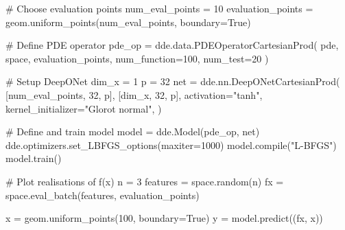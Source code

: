\documentclass[
  spanish,
  us-letterpaper,
]{scrreprt}
\newenvironment{Shaded}{\begin{snugshade}}{\end{snugshade}}
\newcommand{\BuiltInTok}[1]{\textcolor[rgb]{0.00,0.23,0.31}{#1}}
\newcommand{\CommentTok}[1]{\textcolor[rgb]{0.37,0.37,0.37}{#1}}
\newcommand{\DecValTok}[1]{\textcolor[rgb]{0.68,0.00,0.00}{#1}}
\newcommand{\NormalTok}[1]{\textcolor[rgb]{0.00,0.23,0.31}{#1}}
\newcommand{\OperatorTok}[1]{\textcolor[rgb]{0.37,0.37,0.37}{#1}}
\newcommand{\StringTok}[1]{\textcolor[rgb]{0.13,0.47,0.30}{#1}}
\newcommand{\VariableTok}[1]{\textcolor[rgb]{0.07,0.07,0.07}{#1}}
\theoremstyle{plain}
\theoremstyle{definition}
\theoremstyle{remark}
\begin{document}
\begin{Shaded}
\begin{Highlighting}[]
\CommentTok{\# Choose evaluation points}
\NormalTok{num\_eval\_points }\OperatorTok{=} \DecValTok{10}
\NormalTok{evaluation\_points }\OperatorTok{=}\NormalTok{ geom.uniform\_points(num\_eval\_points, boundary}\OperatorTok{=}\VariableTok{True}\NormalTok{)}

\CommentTok{\# Define PDE operator}
\NormalTok{pde\_op }\OperatorTok{=}\NormalTok{ dde.data.PDEOperatorCartesianProd(}
\NormalTok{    pde,}
\NormalTok{    space,}
\NormalTok{    evaluation\_points,}
\NormalTok{    num\_function}\OperatorTok{=}\DecValTok{100}\NormalTok{,}
\NormalTok{    num\_test}\OperatorTok{=}\DecValTok{20}
\NormalTok{)}

\CommentTok{\# Setup DeepONet}
\NormalTok{dim\_x }\OperatorTok{=} \DecValTok{1}
\NormalTok{p }\OperatorTok{=} \DecValTok{32}
\NormalTok{net }\OperatorTok{=}\NormalTok{ dde.nn.DeepONetCartesianProd(}
\NormalTok{    [num\_eval\_points, }\DecValTok{32}\NormalTok{, p],}
\NormalTok{    [dim\_x, }\DecValTok{32}\NormalTok{, p],}
\NormalTok{    activation}\OperatorTok{=}\StringTok{"tanh"}\NormalTok{,}
\NormalTok{    kernel\_initializer}\OperatorTok{=}\StringTok{"Glorot normal"}\NormalTok{,}
\NormalTok{)}

\CommentTok{\# Define and train model}
\NormalTok{model }\OperatorTok{=}\NormalTok{ dde.Model(pde\_op, net)}
\NormalTok{dde.optimizers.set\_LBFGS\_options(maxiter}\OperatorTok{=}\DecValTok{1000}\NormalTok{)}
\NormalTok{model.}\BuiltInTok{compile}\NormalTok{(}\StringTok{"L{-}BFGS"}\NormalTok{)}
\NormalTok{model.train()}

\CommentTok{\# Plot realisations of f(x)}
\NormalTok{n }\OperatorTok{=} \DecValTok{3}
\NormalTok{features }\OperatorTok{=}\NormalTok{ space.random(n)}
\NormalTok{fx }\OperatorTok{=}\NormalTok{ space.eval\_batch(features, evaluation\_points)}

\NormalTok{x }\OperatorTok{=}\NormalTok{ geom.uniform\_points(}\DecValTok{100}\NormalTok{, boundary}\OperatorTok{=}\VariableTok{True}\NormalTok{)}
\NormalTok{y }\OperatorTok{=}\NormalTok{ model.predict((fx, x))}
\end{Highlighting}
\end{Shaded}
\end{document}
